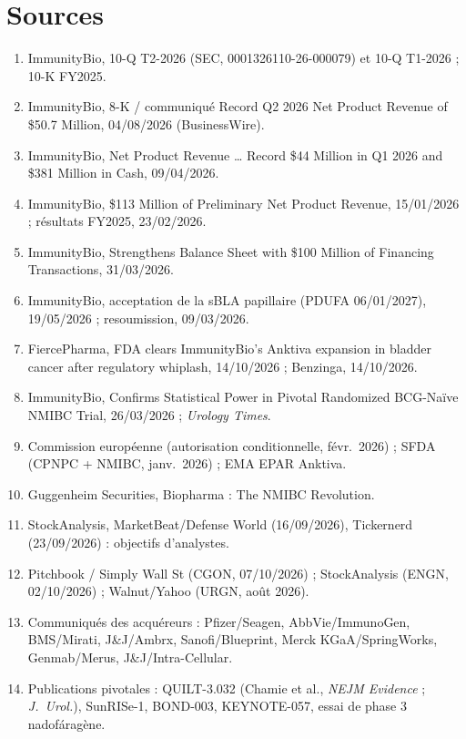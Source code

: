\documentclass[10pt,a4paper]{article}
\begin{document}
\section*{Sources}
\footnotesize
\begin{enumerate}[leftmargin=14pt,itemsep=0pt]
\item ImmunityBio, 10-Q T2-2026 (SEC, 0001326110-26-000079) et 10-Q T1-2026 ; 10-K FY2025.
\item ImmunityBio, 8-K / communiqu\'e \og Record Q2 2026 Net Product Revenue of \$50.7 Million\fg{}, 04/08/2026 (BusinessWire).
\item ImmunityBio, \og Net Product Revenue \ldots{} Record \$44 Million in Q1 2026 and \$381 Million in Cash\fg{}, 09/04/2026.
\item ImmunityBio, \og \$113 Million of Preliminary Net Product Revenue\fg{}, 15/01/2026 ; r\'esultats FY2025, 23/02/2026.
\item ImmunityBio, \og Strengthens Balance Sheet with \$100 Million of Financing Transactions\fg{}, 31/03/2026.
\item ImmunityBio, acceptation de la sBLA papillaire (PDUFA 06/01/2027), 19/05/2026 ; resoumission, 09/03/2026.
\item FiercePharma, \og FDA clears ImmunityBio's Anktiva expansion in bladder cancer after regulatory whiplash\fg{}, 14/10/2026 ; Benzinga, 14/10/2026.
\item ImmunityBio, \og Confirms Statistical Power in Pivotal Randomized BCG-Na\"ive NMIBC Trial\fg{}, 26/03/2026 ; \emph{Urology Times}.
\item Commission europ\'eenne (autorisation conditionnelle, f\'evr.\ 2026) ; SFDA (CPNPC + NMIBC, janv.\ 2026) ; EMA EPAR Anktiva.
\item Guggenheim Securities, \og Biopharma : The NMIBC Revolution\fg{}.
\item StockAnalysis, MarketBeat/Defense World (16/09/2026), Tickernerd (23/09/2026) : objectifs d'analystes.
\item Pitchbook / Simply Wall St (CGON, 07/10/2026) ; StockAnalysis (ENGN, 02/10/2026) ; Walnut/Yahoo (URGN, ao\^ut 2026).
\item Communiqu\'es des acqu\'ereurs : Pfizer/Seagen, AbbVie/ImmunoGen, BMS/Mirati, J\&J/Ambrx, Sanofi/Blueprint, Merck KGaA/SpringWorks, Genmab/Merus, J\&J/Intra-Cellular.
\item Publications pivotales : QUILT-3.032 (Chamie et al., \emph{NEJM Evidence} ; \emph{J.\ Urol.}), SunRISe-1, BOND-003, KEYNOTE-057, essai de phase 3 nadof\'arag\`ene.
\end{enumerate}
\normalsize
\end{document}

